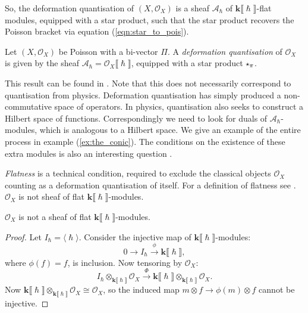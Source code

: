     
    

    So, the deformation quantisation of \( (X,\mathcal{O}_X)\) is a sheaf \( \mathcal{A}_{\hslash}\) of  \( \mathbf{k}\lBrack \hslash\rBrack\)-flat modules, equipped with a star product, such that the star product recovers the Poisson bracket via equation (\ref{eqn:star_to_pois}). 

    \begin{defn} 
    \label{defn:def_quant}
    Let \( (X,\mathcal{O}_X)\) be Poisson with a bi-vector \( \Pi\). A \emph{deformation quantisation} of \( \mathcal{O}_X\) is given by the sheaf \( \mathcal{A}_{\hslash} = \mathcal{O}_X \lBrack \hslash \rBrack \), equipped with a star product \( \starp_{\pi} \).
    \end{defn}
    
    This result can be found in \cite{yekutieli}. Note that this does not necessarily correspond to quantisation from physics. Deformation quantisation has simply produced a non-commutative space of operators. In physics, quantisation also seeks to construct a Hilbert space of functions. Correspondingly we need to look for duals of \( \mathcal{A}_{\hslash}\)-modules, which is analogous to a Hilbert space. We give an example of the entire process in example (\ref{ex:the_conic}). The conditions on the existence of these extra modules is also an interesting question \cite[section 2.4, page 15]{abpolyquant}. 

    \emph{Flatness} is a technical condition, required to exclude the classical objects \( \mathcal{O}_X\) counting as a deformation quantisation of itself. For a definition of flatness see \cite{lang}. \(\mathcal{O}_X\) is not sheaf of flat \( \mathbf{k}\lBrack \hslash \rBrack\)-modules.

    \begin{lem} \( \mathcal{O}_X\) is not a sheaf of flat \( \mathbf{k}\lBrack \hslash \rBrack\)-modules.
    \end{lem}
    \begin{proof}
    Let \( I_{\hslash} = \langle \hslash \rangle \). 
    Consider the injective map of \( \mathbf{k} \lBrack \hslash \rBrack\)-modules:
    \[ 0 \rightarrow  I_{\hslash} \overset{\phi}{\rightarrow} \mathbf{k} \lBrack \hslash \rBrack,\]
    where \( \phi(f)  = f\), is inclusion. Now tensoring by \( \mathcal{O}_X\):
    \[ I_{\hslash} \otimes_{\mathbf{k}\lBrack \hslash \rBrack} \mathcal{O}_X \overset{\Phi}{\rightarrow} \mathbf{k}\lBrack \hslash \rBrack \otimes_{\mathbf{k}\lBrack \hslash \rBrack} \mathcal{O}_X. \]
    Now  \( \mathbf{k}\lBrack \hslash \rBrack \otimes_{\mathbf{k}\lBrack \hslash \rBrack} \mathcal{O}_X \cong \mathcal{O}_X\), so the induced map \( m \otimes f \rightarrow \phi(m) \otimes f \) cannot be injective.  %
    \end{proof}

